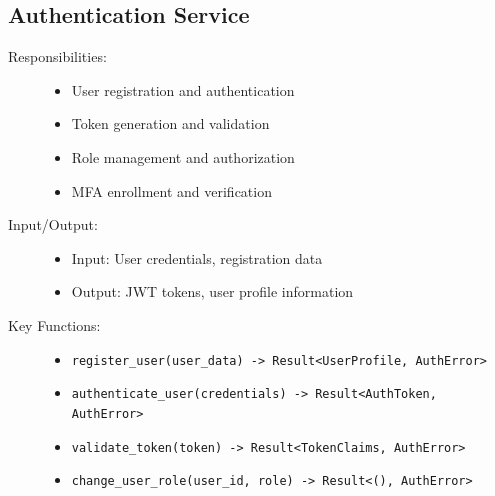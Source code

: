 \documentclass[a4paper, 11pt]{scrreprt}
\begin{document}
\subsection{Authentication Service}
\begin{description}
    \item[Responsibilities:]
    \begin{itemize}
        \item User registration and authentication
        \item Token generation and validation
        \item Role management and authorization
        \item MFA enrollment and verification
    \end{itemize}
    
    \item[Input/Output:]
    \begin{itemize}
        \item Input: User credentials, registration data
        \item Output: JWT tokens, user profile information
    \end{itemize}
    
    \item[Key Functions:]
    \begin{itemize}
        \item \texttt{register\_user(user\_data) -> Result<UserProfile, AuthError>}
        \item \texttt{authenticate\_user(credentials) -> Result<AuthToken, AuthError>}
        \item \texttt{validate\_token(token) -> Result<TokenClaims, AuthError>}
        \item \texttt{change\_user\_role(user\_id, role) -> Result<(), AuthError>}
    \end{itemize}
\end{description}
\end{document}
